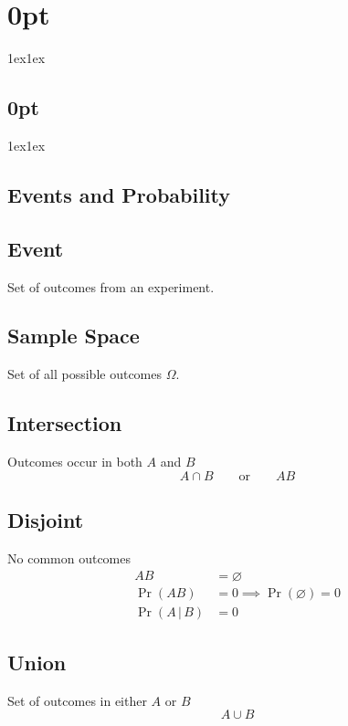 \documentclass{article}
\begin{document}
\titlespacing*\section{0pt}{1ex}{1ex}
\titlespacing*\subsection{0pt}{1ex}{1ex}
%
\setlength\belowcaptionskip{-15pt}
\setlength\textfloatsep{0pt}
%
\setlength\abovedisplayskip{1pt}
\setlength\belowdisplayskip{1pt}

\begin{multicols}{3}
    \section{Events and Probability}
    \subsection{Event}
    Set of outcomes from an experiment.
    \subsection{Sample Space}
    Set of all possible outcomes \(\Omega\).
    \subsection{Intersection}
    Outcomes occur in both \(A\) and \(B\)
    \begin{equation*}
        A \cap B \quad\quad \text{or} \quad\quad AB
    \end{equation*}
    \subsection{Disjoint}
    No common outcomes
    \begin{align*}
        AB                                & = \varnothing                                    \\
        \Pr{\left( AB \right)}            & = 0 \implies \Pr{\left( \varnothing \right)} = 0 \\
        \Pr{\left( A \,\vert\, B \right)} & = 0
    \end{align*}
    \subsection{Union}
    Set of outcomes in either \(A\) or \(B\)
    \begin{equation*}
        A \cup B
    \end{equation*}

\end{multicols}
\end{document}

